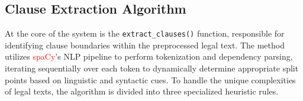 \documentclass[twoside,final]{hcmut-report}
\begin{document}
\subsection{Clause Extraction Algorithm}
At the core of the system is the \verb|extract_clauses()| function, responsible for identifying clause boundaries within the preprocessed legal text. The method utilizes \textcolor{red}{\textcolor{red}{\textcolor{red}{spaCy}}}'s NLP pipeline to perform tokenization and dependency parsing, iterating sequentially over each token to dynamically determine appropriate split points based on linguistic and syntactic cues. To handle the unique complexities of legal texts, the algorithm is divided into three specialized heuristic rules.





\end{document}
